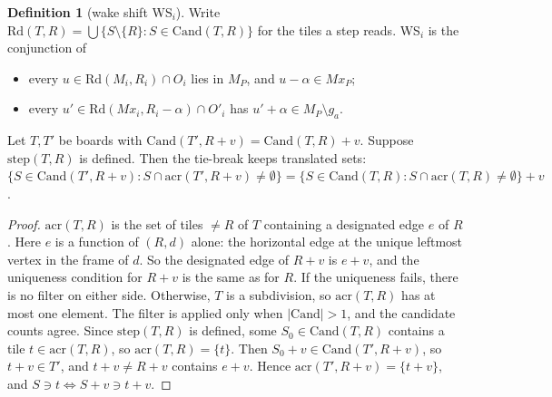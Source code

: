 \documentclass[11pt]{article}
\theoremstyle{definition}\newtheorem{definition}[theorem]{Definition}\newtheorem{remark}[theorem]{Remark}
\begin{document}
\begin{definition}[wake shift WS$_i$]\label{def:ws}
Write $\mathrm{Rd}(T,R)=\bigcup\{S\setminus\{R\}:S\in\mathrm{Cand}(T,R)\}$ for the tiles a step reads. WS$_i$ is the conjunction of
\begin{itemize}
\item[(M)] every $u\in\mathrm{Rd}(M_i,R_i)\cap O_i$ lies in $M_P$, and $u-\alpha\in Mx_P$;
\item[(X)] every $u'\in\mathrm{Rd}(Mx_i,R_i-\alpha)\cap O'_i$ has $u'+\alpha\in M_P\setminus g_a$.
\end{itemize}
\end{definition}

\begin{lemma}\label{lem:acr}
Let $T,T'$ be boards with $\mathrm{Cand}(T',R+v)=\mathrm{Cand}(T,R)+v$. Suppose $\mathrm{step}(T,R)$ is defined. Then the tie-break keeps translated sets: $\{S\in\mathrm{Cand}(T',R+v):S\cap\mathrm{acr}(T',R+v)\ne\emptyset\}=\{S\in\mathrm{Cand}(T,R):S\cap\mathrm{acr}(T,R)\ne\emptyset\}+v$.
\end{lemma}
\begin{proof}
$\mathrm{acr}(T,R)$ is the set of tiles $\ne R$ of $T$ containing a designated edge $e$ of $R$. Here $e$ is a function of $(R,d)$ alone: the horizontal edge at the unique leftmost vertex in the frame of $d$. So the designated edge of $R+v$ is $e+v$, and the uniqueness condition for $R+v$ is the same as for $R$.
If the uniqueness fails, there is no filter on either side. Otherwise, $T$ is a subdivision, so $\mathrm{acr}(T,R)$ has at most one element.
The filter is applied only when $|\mathrm{Cand}|>1$, and the candidate counts agree. Since $\mathrm{step}(T,R)$ is defined, some $S_0\in\mathrm{Cand}(T,R)$ contains a tile $t\in\mathrm{acr}(T,R)$, so $\mathrm{acr}(T,R)=\{t\}$.
Then $S_0+v\in\mathrm{Cand}(T',R+v)$, so $t+v\in T'$, and $t+v\ne R+v$ contains $e+v$. Hence $\mathrm{acr}(T',R+v)=\{t+v\}$, and $S\ni t\iff S+v\ni t+v$.
\end{proof}
\end{document}
